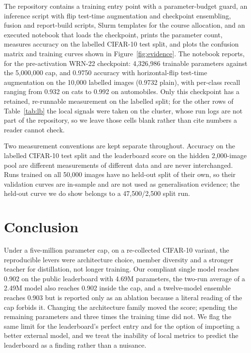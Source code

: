 \documentclass[letterpaper]{article} %
\begin{document}
The repository contains a training entry point with a parameter-budget guard, an inference
script with flip test-time augmentation and checkpoint ensembling, fusion and report-build
scripts, Slurm templates for the course allocation, and an executed notebook that loads the
checkpoint, prints the parameter count, measures accuracy on the labelled CIFAR-10 test split,
and plots the confusion matrix and training curves shown in Figure~\ref{fig:evidence}. The
notebook reports, for the
pre-activation WRN-22 checkpoint: 4{,}326{,}986 trainable parameters against the
5{,}000{,}000 cap, and 0.9750 accuracy with horizontal-flip test-time augmentation on the
10{,}000 labelled images (0.9732 plain), with per-class recall ranging from 0.932 on cats to
0.992 on automobiles. Only this checkpoint has a retained, re-runnable measurement on the
labelled split; for the other rows of Table~\ref{tab:lb} the local signals were taken on the
cluster, whose run logs are not part of the repository, so we leave those cells blank rather than
cite numbers a reader cannot check.

Two measurement conventions are kept separate throughout. Accuracy on the labelled CIFAR-10
test split and the leaderboard score on the hidden 2{,}000-image pool are different
measurements of different data and are never interchanged. Runs trained on all 50{,}000 images
have no held-out split of their own, so their validation curves are in-sample and are not used
as generalisation evidence; the held-out curve we do show belongs to a 47{,}500/2{,}500 split
run.

\section{Conclusion}

Under a five-million parameter cap, on a re-collected CIFAR-10 variant, the reproducible levers
were architecture choice, member diversity and a stronger teacher for distillation, not longer
training.
Our compliant single model reaches 0.902 on the public leaderboard with 4.69M parameters, the
two-run average of a 2.49M model also reaches 0.902 inside the cap, and a
twelve-model ensemble reaches 0.903 but is reported only as an ablation because a
literal reading of the cap forbids it. Changing the architecture family moved the score; spending
the remaining parameters and three times the training time did not. We flag the same limit for the leaderboard's perfect
entry and for the option of importing a better external model, and we treat the inability of
local metrics to predict the leaderboard as a finding rather than a nuisance.


\end{document}
